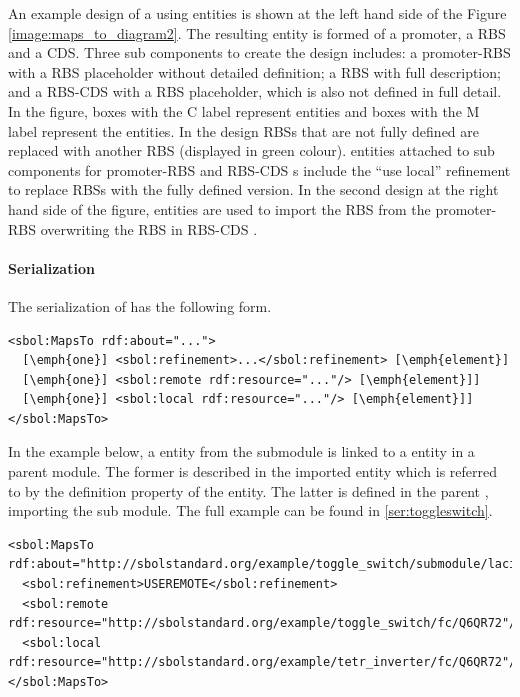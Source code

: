 An example design of a  using  entities is shown at the left hand side of the Figure \ref{image:maps_to_diagram2}. The resulting entity is formed of a promoter, a RBS and a CDS. 
Three sub components to create the design includes: a promoter-RBS  with a RBS placeholder without detailed definition; a RBS  with full description; and a RBS-CDS  with a RBS placeholder, which is also not defined in full detail. 
In the figure, boxes with the C label represent  entities and boxes with the M label represent the  entities.
In the design RBSs that are not fully defined are replaced with another RBS  (displayed in green colour).  entities attached to sub components for promoter-RBS and RBS-CDS s include the ``use local'' refinement to replace RBSs with the fully defined version. In the second design at the right hand side of the figure,  entities are used to import the RBS from the promoter-RBS  overwriting the RBS in RBS-CDS . 


\paragraph{Serialization}
The serialization of  has the following form.
\begin{lstlisting}
<sbol:MapsTo rdf:about="...">
  [\emph{one}] <sbol:refinement>...</sbol:refinement> [\emph{element}]
  [\emph{one}] <sbol:remote rdf:resource="..."/> [\emph{element}]]
  [\emph{one}] <sbol:local rdf:resource="..."/> [\emph{element}]]
</sbol:MapsTo>
\end{lstlisting}

In the example below, a  entity from the submodule is linked to a  entity in a parent module. The former is described in the imported  entity which is referred to by the definition property of the  entity. The latter is defined in the parent , importing the sub module. The full example can be found in \ref{ser:toggleswitch}.
\begin{lstlisting}
<sbol:MapsTo rdf:about="http://sbolstandard.org/example/toggle_switch/submodule/laci_inverter/mapping/Q6QR72">
  <sbol:refinement>USEREMOTE</sbol:refinement>
  <sbol:remote rdf:resource="http://sbolstandard.org/example/toggle_switch/fc/Q6QR72"/>
  <sbol:local rdf:resource="http://sbolstandard.org/example/tetr_inverter/fc/Q6QR72"/>
</sbol:MapsTo>
\end{lstlisting}




